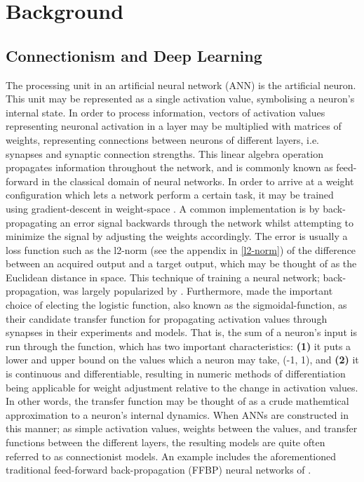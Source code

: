 
\chapter{Background}\label{chpt:background}

\section{Connectionism and Deep Learning}
The processing unit in an artificial neural network (ANN) is the artificial neuron. This unit may be represented as a single activation value, symbolising a neuron's internal state. In order to process information, vectors of activation values representing neuronal activation in a layer may be multiplied with matrices of weights, representing connections between neurons of different layers, i.e. synapses and synaptic connection strengths. This linear algebra operation propagates information throughout the network, and is commonly known as feed-forward in the classical domain of neural networks. In order to arrive at a weight configuration which lets a network perform a certain task, it may be trained using gradient-descent in weight-space \citep{Hinton1989}. A common implementation is by  back-propagating an error signal backwards through the network whilst attempting to minimize the signal by adjusting the weights accordingly. The error is usually a loss function such as the l2-norm (see the appendix in \ref{l2-norm}) of the difference between an acquired output and a target output, which may be thought of as the Euclidean distance in space. This technique of training a neural network; back-propagation, was largely popularized by \cite{Rumelhart1986}. Furthermore, \cite{Rumelhart1986} made the important choice of electing the logistic function, also known as the sigmoidal-function, as their candidate transfer function for propagating activation values through synapses in their experiments and models. That is, the sum of a neuron's input is run through the function, which has two important characteristics: \textbf{(1)} it puts a lower and upper bound on the values which a neuron may take, (-1, 1), and \textbf{(2)} it is continuous and differentiable, resulting in numeric methods of differentiation being applicable for weight adjustment relative to the change in activation values. In other words, the transfer function may be thought of as a crude mathemtical approximation to a neuron's internal dynamics.
When ANNs are constructed in this manner; as simple activation values, weights between the values, and transfer functions between the different layers, the resulting models are quite often referred to as connectionist models. An example includes the aforementioned traditional feed-forward back-propagation (FFBP) neural networks of \citep{Rumelhart1986}.

